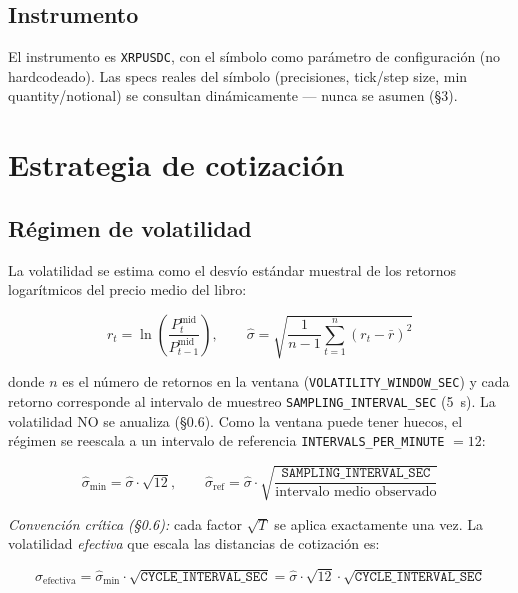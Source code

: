 \documentclass[11pt,a4paper]{article}
\newcommand{\codigo}[1]{\texttt{#1}}
\begin{document}
\subsection{Instrumento}
El instrumento es \codigo{XRPUSDC}, con el símbolo como parámetro de
configuración (no hardcodeado). Las specs reales del símbolo
(precisiones, tick/step size, min quantity/notional) se consultan
dinámicamente — nunca se asumen (§3).

\section{Estrategia de cotización}

\subsection{Régimen de volatilidad}
La volatilidad se estima como el desvío estándar muestral de los
retornos logarítmicos del precio medio del libro:

\begin{equation}
  r_t = \ln\!\left(\frac{P_t^{\mathrm{mid}}}{P_{t-1}^{\mathrm{mid}}}\right),
  \qquad
  \hat{\sigma} = \sqrt{\frac{1}{n-1}\sum_{t=1}^{n}\left(r_t - \bar{r}\right)^2}
\end{equation}

donde $n$ es el número de retornos en la ventana
(\codigo{VOLATILITY\_WINDOW\_SEC}) y cada retorno corresponde al
intervalo de muestreo \codigo{SAMPLING\_INTERVAL\_SEC} (5~s). La
volatilidad NO se anualiza (§0.6). Como la ventana puede tener huecos,
el régimen se reescala a un intervalo de referencia
\codigo{INTERVALS\_PER\_MINUTE} $= 12$:

\begin{equation}
  \hat{\sigma}_{\min} = \hat{\sigma}\cdot\sqrt{12},
  \qquad
  \hat{\sigma}_{\mathrm{ref}}
  = \hat{\sigma}\cdot\sqrt{\frac{\codigo{SAMPLING\_INTERVAL\_SEC}}
  {\text{intervalo medio observado}}}
\end{equation}

\emph{Convención crítica (§0.6):} cada factor $\sqrt{T}$ se aplica
exactamente una vez. La volatilidad \emph{efectiva} que escala las
distancias de cotización es:

\begin{equation}
  \sigma_{\mathrm{efectiva}}
  = \hat{\sigma}_{\min}\cdot\sqrt{\codigo{CYCLE\_INTERVAL\_SEC}}
  = \hat{\sigma}\cdot\sqrt{12}\cdot\sqrt{\codigo{CYCLE\_INTERVAL\_SEC}}
\end{equation}
\end{document}
